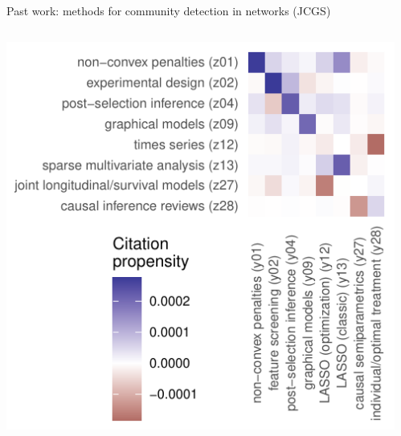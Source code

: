 \documentclass[aspectratio=169]{beamer}
\theoremstyle{remark}
\begin{document}
\begin{frame}{Past work: methods for community detection in networks (JCGS)}
    \vfill
    \begin{columns}
        \begin{column}{0.5\textwidth}
            \includegraphics[width=\textwidth]{./figures/B-subplot.pdf}
        \end{column}
        \begin{column}{0.5\textwidth}
            \centering

\end{column}
\end{columns}
\end{frame}
\end{document}
